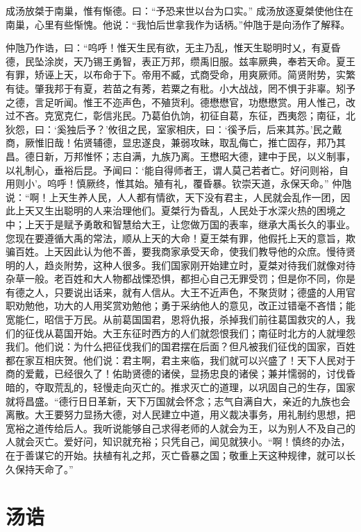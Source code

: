 \documentclass[12pt,UTF8]{ctexbook}
\begin{document}
成汤放桀于南巢，惟有惭德。曰：“予恐来世以台为口实。”
成汤放逐夏桀使他住在南巢，心里有些惭愧。他说：“我怕后世拿我作为话柄。”仲虺于是向汤作了解释。

仲虺乃作诰，曰：“呜呼！惟天生民有欲，无主乃乱，惟天生聪明时乂，有夏昏德，民坠涂炭，天乃锡王勇智，表正万邦，缵禹旧服。兹率厥典，奉若天命。夏王有罪，矫诬上天，以布命于下。帝用不臧，式商受命，用爽厥师。简贤附势，实繁有徒。肇我邦于有夏，若苗之有莠，若粟之有秕。小大战战，罔不惧于非辜。矧予之德，言足听闻。惟王不迩声色，不殖货利。德懋懋官，功懋懋赏。用人惟己，改过不吝。克宽克仁，彰信兆民。乃葛伯仇饷，初征自葛，东征，西夷怨；南征，北狄怨，曰：‘奚独后予？’攸徂之民，室家相庆，曰：‘徯予后，后来其苏。’民之戴商，厥惟旧哉！佑贤辅德，显忠遂良，兼弱攻昧，取乱侮亡，推亡固存，邦乃其昌。德日新，万邦惟怀；志自满，九族乃离。王懋昭大德，建中于民，以义制事，以礼制心，垂裕后昆。予闻曰：‘能自得师者王，谓人莫己若者亡。好问则裕，自用则小’。呜呼！慎厥终，惟其始。殖有礼，覆昏暴。钦崇天道，永保天命。”
仲虺说：“啊！上天生养人民，人人都有情欲，天下没有君主，人民就会乱作一团，因此上天又生出聪明的人来治理他们。夏桀行为昏乱，人民处于水深火热的困境之中；上天于是赋予勇敢和智慧给大王，让您做万国的表率，继承大禹长久的事业。您现在要遵循大禹的常法，顺从上天的大命！夏王桀有罪，他假托上天的意旨，欺骗百姓。上天因此认为他不善，要我商家承受天命，使我们教导他的众庶。慢待贤明的人，趋炎附势，这种人很多。我们国家刚开始建立时，夏桀对待我们就像对待杂草一般。老百姓和大人物都战慄恐惧，都担心自己无罪受罚；但是你不同，你是有德之人，只要说出话来，就有人信从。大王不近声色，不聚货财；德盛的人用官职劝勉他，功大的人用奖赏劝勉他；勇于采纳他人的意见，改正过错毫不吝惜；能宽能仁，昭信于万民。从前葛国国君，恩将仇报，杀掉我们前往葛国救灾的人，我们的征伐从葛国开始。大王东征时西方的人们就怨恨我们；南征时北方的人就埋怨我们。他们说：为什么把征伐我们的国君摆在后面？但凡被我们征伐的国家，百姓都在家互相庆贺。他们说：君主啊，君主来临，我们就可以兴盛了！天下人民对于商的爱戴，已经很久了！佑助贤德的诸侯，显扬忠良的诸侯；兼并懦弱的，讨伐昏暗的，夺取荒乱的，轻慢走向灭亡的。推求灭亡的道理，以巩固自己的生存，国家就将昌盛。“德行日日革新，天下万国就会怀念；志气自满自大，亲近的九族也会离散。大王要努力显扬大德，对人民建立中道，用义裁决事务，用礼制约思想，把宽裕之道传给后人。我听说能够自己求得老师的人就会为王，以为别人不及自己的人就会灭亡。爱好问，知识就充裕；只凭自己，闻见就狭小。“啊！慎终的办法，在于善谋它的开始。扶植有礼之邦，灭亡昏暴之国；敬重上天这种规律，就可以长久保持天命了。”

\chapter{汤诰}
\end{document}
